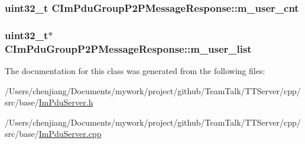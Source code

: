 \subsubsection[{m\+\_\+user\+\_\+cnt}]{\setlength{\rightskip}{0pt plus 5cm}uint32\+\_\+t C\+Im\+Pdu\+Group\+P2\+P\+Message\+Response\+::m\+\_\+user\+\_\+cnt\hspace{0.3cm}{\ttfamily [private]}}\label{class_c_im_pdu_group_p2_p_message_response_a6abe3687a10a416111c90be085c966f1}
\hypertarget{class_c_im_pdu_group_p2_p_message_response_ab917f135d8ffdfa05cf94559e06c1868}{}
\subsubsection[{m\+\_\+user\+\_\+list}]{\setlength{\rightskip}{0pt plus 5cm}uint32\+\_\+t$\ast$ C\+Im\+Pdu\+Group\+P2\+P\+Message\+Response\+::m\+\_\+user\+\_\+list\hspace{0.3cm}{\ttfamily [private]}}\label{class_c_im_pdu_group_p2_p_message_response_ab917f135d8ffdfa05cf94559e06c1868}


The documentation for this class was generated from the following files\+:\begin{DoxyCompactItemize}
\item 
/\+Users/chenjiang/\+Documents/mywork/project/github/\+Team\+Talk/\+T\+T\+Server/cpp/src/base/\hyperlink{_im_pdu_server_8h}{Im\+Pdu\+Server.\+h}\item 
/\+Users/chenjiang/\+Documents/mywork/project/github/\+Team\+Talk/\+T\+T\+Server/cpp/src/base/\hyperlink{_im_pdu_server_8cpp}{Im\+Pdu\+Server.\+cpp}\end{DoxyCompactItemize}
